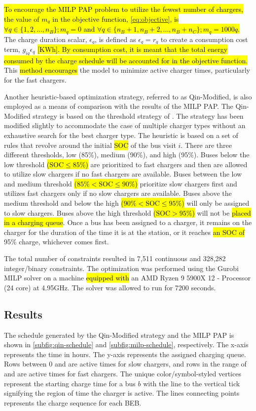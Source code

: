 \documentclass[utf8]{FrontiersinHarvard}
\let\cite\citep                                       %
\newcommand{\fast}{15 }                                                         %
\newcommand{\slow}{15 }                                                         %
\newcommand{\contvars}{7,511 }
\newcommand{\intvars}{328,282 }
\newcommand{\timeran}{7200 }                                                    %
\begin{document}
\hl{To encourage the MILP PAP problem to utilize the fewest number of chargers, the value of $m_q$ in the objective function, {\autoref{eq:objective}}, is $\forall q \in \{1,2,..., n_B \}; m_q = 0$ and $\forall q \in \{n_B + 1, n_B + 2,..., n_B + n_C \}; m_q = 1000q$.} The charge duration scalar, \(\epsilon_q\), is defined as \(\epsilon_q = r_q\) to create a consumption cost
term, \(g_{iq}\epsilon_q\) \hl{[KWh]. By consumption cost, it is meant that the total energy consumed by the charge schedule will be accounted for in the objective function.} This \hl{method encourages} the model to minimize
active charger times, particularly for the fast chargers.

Another heuristic-based optimization strategy, referred to as Qin-Modified, is also employed as a means of comparison
with the results of the MILP PAP. The Qin-Modified strategy is based on the threshold strategy of
\cite{qin-2016-numer-analy}. The strategy has been modified slightly to accommodate the case of multiple charger types
without an exhaustive search for the best charger type. The heuristic is based on a set of rules that revolve around the
initial \hl{SOC} of the bus visit \(i\). There are three different thresholds, low (85\%),
medium (90\%), and high (95\%). Buses below the low threshold \hl{($\text{SOC} \le 85\%$)} are prioritized to
fast chargers and then are allowed to utilize slow chargers if no fast chargers are available. Buses between the low and
medium threshold \hl{($85\% < \text{SOC} \le 90\%$)} prioritize slow chargers first and utilizes fast chargers
only if no slow chargers are available. Buses above the medium threshold and below the high \hl{($90\% < \text{SOC} \le 95\%$)} will only be assigned to slow chargers. Buses above the high threshold \hl{($\text{SOC} > 95\%$)} will not be \hl{placed in a charging queue}. Once a bus has been assigned to a charger, it remains
on the charger for the duration of the time it is at the station, or it reaches \hl{an SOC of} 95\% charge,
whichever comes first.

The total number of constraints resulted in \contvars continuous and \intvars integer/binary constraints. The
optimization was performed using the Gurobi MILP solver \cite{gurobi-2021-gurob-optim} on a machine
\hl{equipped with} an AMD Ryzen 9 5900X 12 - Processor (24 core) at 4.95GHz. The solver was allowed to run
for \timeran seconds.

\subsection{Results}
\label{results}
The schedule generated by the Qin-Modified strategy and the MILP PAP is shown in \autoref{subfig:qin-schedule} and
\autoref{subfig:milp-schedule}, respectively. The x-axis represents the time in hours. The y-axis represents the
assigned charging queue. Rows between 0 and \fpeval{\slow - 1} are active times for slow chargers, and rows in the range
of \fpeval{\slow - 1} and \fpeval{\fast + \slow - 1} are active times for fast chargers. The unique color/symbol-styled
vertices represent the starting charge time for a bus \(b\) with the line to the vertical tick signifying the region of
time the charger is active. The lines connecting points represents the charge sequence for each BEB.
\end{document}
